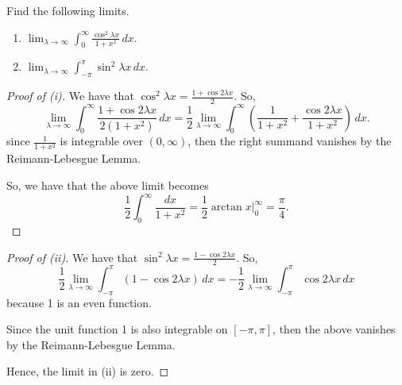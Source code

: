 \documentclass[../hw5]{subfiles}
\begin{document}
\begin{problem}
Find the following limits.
\begin{enumerate}
	\item $\lim_{\lambda \to \infty} \int_{0}^{\infty} \frac{\cos^2{\lambda x} }{1 + x^2} \,dx$.
	\item $\lim_{\lambda \to \infty} \int_{-\pi}^{\pi} \sin^2{\lambda x}\,dx$.
\end{enumerate}
\end{problem}
\begin{proof}[Proof of (i)]
	We have that $\cos^2{\lambda x} = \frac{1 + \cos{2\lambda x} }{2} $.
	So, \[
		\lim_{\lambda \to \infty} \int_{0}^{\infty} \frac{1+\cos{2\lambda x}}{2(1 + x^2)} \,dx
		= \frac{1}{2} \lim_{\lambda \to \infty} \int_{0}^{\infty} \left( \frac{1}{1+x^2} + \frac{\cos{2\lambda x} }{1+x^2} \right)  \,dx
		.\]
	since $\frac{1}{1 + x^2}$ is integrable over $(0,\infty)$, then the right summand vanishes by the Reimann-Lebesgue Lemma.

	So, we have that the above limit becomes \[
		\frac{1}{2}\int_{0}^{\infty} \frac{dx}{1 + x^2} = \frac{1}{2}\arctan x \Big\vert_0^{\infty} = \frac{\pi}{4}
		.\]
\end{proof}
\begin{proof}[Proof of (ii)]
	We have that $\sin^2{\lambda x} = \frac{1-\cos{2\lambda x} }{2} $. So, \[
		\frac{1}{2} \lim_{\lambda \to \infty} \int_{-\pi}^{\pi} (1-\cos{2\lambda x} ) \,dx
		= -\frac{1}{2}\lim_{\lambda \to \infty} \int_{-\pi}^{\pi} \cos{2\lambda x}\,dx
	\] because 1 is an even function.

	Since the unit function 1 is also integrable on $[-\pi,\pi]$, then the above vanishes by the Reimann-Lebesgue Lemma.

	Hence, the limit in (ii) is zero.
\end{proof}
\end{document}
